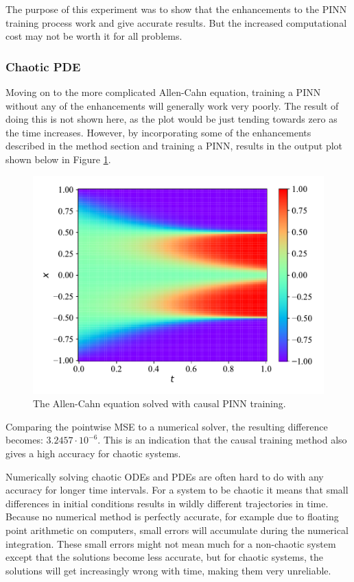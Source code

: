 The purpose of this experiment was to show that the enhancements to the PINN training process work and give accurate results. But the increased computational cost may not be worth it for all problems.

\subsubsection{Chaotic PDE}

Moving on to the more complicated Allen-Cahn equation, training a PINN without any of the enhancements will generally work very poorly. The result of doing this is not shown here, as the plot would be just tending towards zero as the time increases. However, by incorporating some of the enhancements described in the method section and training a PINN, results in the output plot shown below in Figure \ref{fig:causal_ac}.

\begin{figure}[H]
    \centering
    \includegraphics[width=1.0\linewidth]{Figures/IntermediateExperiments/Causality/AC/ac.pdf}
    \caption{The Allen-Cahn equation solved with causal PINN training.}
    \label{fig:causal_ac}
\end{figure}

Comparing the pointwise MSE to a numerical solver, the resulting difference becomes: $3.2457 \cdot 10^{-6}$. This is an indication that the causal training method also gives a high accuracy for chaotic systems.

Numerically solving chaotic ODEs and PDEs are often hard to do with any accuracy for longer time intervals. For a system to be chaotic it means that small differences in initial conditions results in wildly different trajectories in time. Because no numerical method is perfectly accurate, for example due to floating point arithmetic on computers, small errors will accumulate during the numerical integration. These small errors might not mean much for a non-chaotic system except that the solutions become less accurate, but for chaotic systems, the solutions will get increasingly wrong with time, making them very unreliable.

